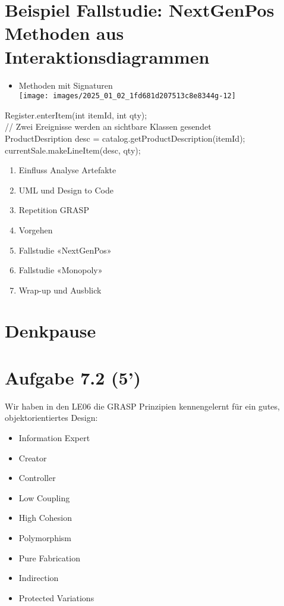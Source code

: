 \documentclass[10pt]{article}
\begin{document}
\section*{Beispiel Fallstudie: NextGenPos Methoden aus Interaktionsdiagrammen}
\begin{itemize}
  \item Methoden mit Signaturen\\
\texttt{[image: images/2025\_01\_02\_1fd681d207513c8e8344g-12]}
\end{itemize}

Register.enterItem(int itemId, int qty);\\
// Zwei Ereignisse werden an sichtbare Klassen gesendet\\
ProductDesription desc = catalog.getProductDescription(itemId); currentSale.makeLineItem(desc, qty);

\begin{enumerate}
  \item Einfluss Analyse Artefakte
  \item UML und Design to Code
  \item Repetition GRASP
  \item Vorgehen
  \item Fallstudie «NextGenPos»
  \item Fallstudie «Monopoly»
  \item Wrap-up und Ausblick
\end{enumerate}

\section*{Denkpause}
\section*{Aufgabe 7.2 (5')}
Wir haben in den LE06 die GRASP Prinzipien kennengelernt für ein gutes, objektorientiertes Design:

\begin{itemize}
  \item Information Expert
  \item Creator
  \item Controller
  \item Low Coupling
  \item High Cohesion
  \item Polymorphism
  \item Pure Fabrication
  \item Indirection
  \item Protected Variations
\end{itemize}
\end{document}
